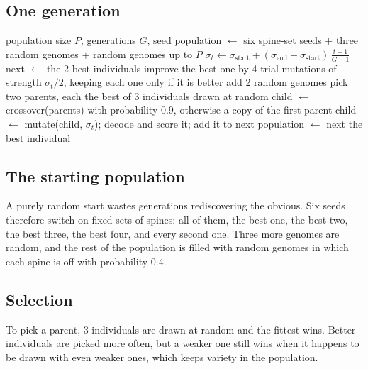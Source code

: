 \documentclass[10pt,a4paper]{article}
\begin{document}
\subsection{One generation}
\begin{algorithm}[H]
\caption{Updated (memetic) GA}
\begin{algorithmic}[1]
\Require population size $P$, generations $G$, seed
\State population $\gets$ six spine-set seeds $+$ three random genomes $+$ random genomes up to $P$
  \State $\sigma_t \gets \sigma_{\text{start}} + (\sigma_{\text{end}} - \sigma_{\text{start}})\,\frac{t-1}{G-1}$ 
  \State next $\gets$ the 2 best individuals 
  \State improve the best one by 4 trial mutations of strength $\sigma_t/2$, keeping each one only if it is better 
    \State add 2 random genomes 
  \EndIf
    \State pick two parents, each the best of 3 individuals drawn at random 
    \State child $\gets$ crossover(parents) with probability 0.9, otherwise a copy of the first parent
    \State child $\gets$ mutate(child, $\sigma_t$); decode and score it; add it to next
  \EndWhile
  \State population $\gets$ next
\EndFor
\State \Return the best individual
\end{algorithmic}
\end{algorithm}

\subsection{The starting population}
A purely random start wastes generations rediscovering the obvious. Six seeds therefore switch on fixed sets of
spines: all of them, the best one, the best two, the best three, the best four, and every second one. Three more
genomes are random, and the rest of the population is filled with random genomes in which each spine is off with
probability 0.4.

\subsection{Selection}
To pick a parent, 3 individuals are drawn at random and the fittest wins. Better individuals are picked more
often, but a weaker one still wins when it happens to be drawn with even weaker ones, which keeps variety in the
population.
\end{document}
